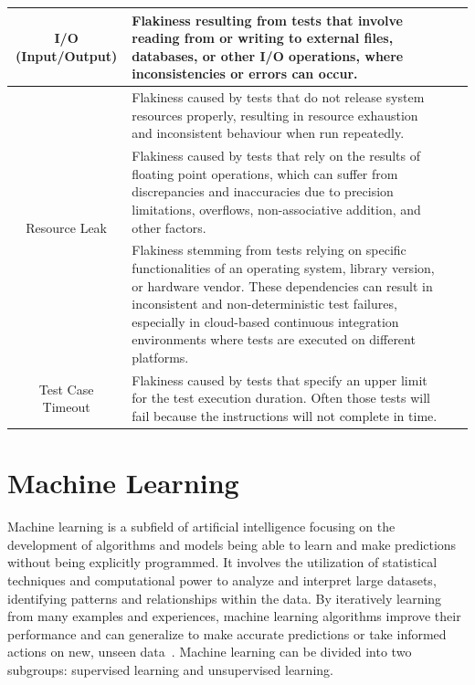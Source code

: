 \begin{table}[ht]
{\begin{tabular}{c|p{10cm}|c}
\midrule
\multirow{3}{*}{I/O (Input/Output)} & Flakiness resulting from tests that involve reading from or writing to external files, databases, or other I/O operations, where inconsistencies or errors can occur. & \multirow{3}{*}{~\cite{Eck2019,Gruber2021,Luo2014,Lam2020a}}\\
\midrule
\multirow{3}{*}{Resource Leak} & Flakiness caused by tests that do not release system resources properly, resulting in resource exhaustion and inconsistent behaviour when run repeatedly. & \multirow{3}{*}{~\cite{Eck2019,Gruber2021,Luo2014,Lam2020a}}\\
\midrule
\multirow{4}{*}{Floating Point} & Flakiness caused by tests that rely on the results of floating point operations, which can suffer from discrepancies and inaccuracies due to precision limitations, overflows, non-associative addition, and other factors. & \multirow{4}{*}{~\cite{Eck2019,Luo2014,Lam2020a}}\\
\midrule
\multirow{6}{*}{Platform Dependency} & Flakiness stemming from tests relying on specific functionalities of an operating system, library version, or hardware vendor. These dependencies can result in inconsistent and non-deterministic test failures, especially in cloud-based continuous integration environments where tests are executed on different platforms. & \multirow{6}{*}{~\cite{Gruber2021,Eck2019}}\\
\midrule
\multirow{3}{*}{Test Case Timeout} & Flakiness caused by tests that specify an upper limit for the test execution duration. Often those tests will fail because the instructions will not complete in time. & \multirow{3}{*}{~\cite{Eck2019,Gruber2021}}\\
\bottomrule
\end{tabular}}
\end{table}



\section{Machine Learning}

Machine learning is a subfield of artificial intelligence focusing on the development of algorithms and models being able to learn and make predictions without being explicitly programmed. It involves the utilization of statistical techniques and computational power to analyze and interpret large datasets, identifying patterns and relationships within the data. By iteratively learning from many examples and experiences, machine learning algorithms improve their performance and can generalize to make accurate predictions or take informed actions on new, unseen data~\cite{mitchell2007machine,janiesch2021machine}. Machine learning can be divided into two subgroups: supervised learning and unsupervised learning.

